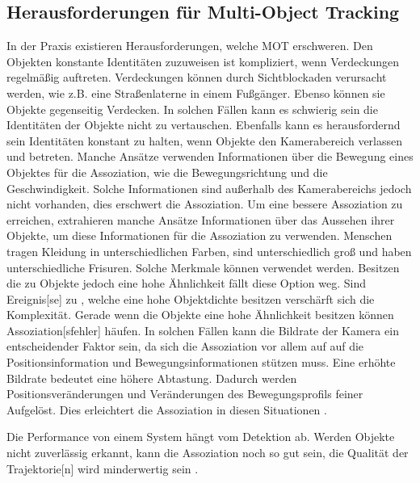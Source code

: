 \subsection{Herausforderungen für Multi-Object Tracking} \label{sec:MOT Herausforderungen}
In der Praxis existieren Herausforderungen, welche \gls{MOT} erschweren. Den Objekten konstante Identitäten zuzuweisen ist kompliziert, wenn Verdeckungen regelmäßig auftreten. Verdeckungen können durch Sichtblockaden verursacht werden, wie z.B. eine Straßenlaterne in einem Fußgänger. Ebenso können sie Objekte gegenseitig Verdecken. In solchen Fällen kann es schwierig sein die Identitäten der Objekte nicht zu vertauschen. Ebenfalls kann es herausfordernd sein Identitäten konstant zu halten, wenn Objekte den Kamerabereich verlassen und betreten. Manche Ansätze verwenden Informationen über die Bewegung eines Objektes für die  \gls{Assoziation}, wie die Bewegungsrichtung und die Geschwindigkeit. Solche Informationen sind außerhalb des Kamerabereichs jedoch nicht vorhanden, dies erschwert die \gls{Assoziation}. Um eine bessere \gls{Assoziation} zu erreichen, extrahieren manche Ansätze Informationen über das Aussehen ihrer Objekte, um diese Informationen für die \gls{Assoziation} zu verwenden. Menschen tragen Kleidung in unterschiedlichen Farben, sind unterschiedlich groß und haben unterschiedliche Frisuren. Solche Merkmale können verwendet werden. Besitzen die zu  Objekte jedoch eine hohe Ähnlichkeit fällt diese Option weg. Sind \gls{Ereignis}[se] zu , welche eine hohe Objektdichte besitzen verschärft sich die Komplexität. Gerade wenn die Objekte eine hohe Ähnlichkeit besitzen können \gls{Assoziation}[sfehler] häufen. 
In solchen Fällen kann die Bildrate der Kamera ein entscheidender Faktor sein, da sich die \gls{Assoziation} vor allem auf auf die Positionsinformation und Bewegungsinformationen stützen muss. Eine erhöhte Bildrate bedeutet eine höhere Abtastung. Dadurch werden Positionsveränderungen und Veränderungen des Bewegungsprofils feiner Aufgelöst. Dies erleichtert die \gls{Assoziation} in diesen Situationen \cite{Luo.2022, Feng.2022}. \par

Die Performance von einem  System hängt vom \gls{Detektion} ab. Werden Objekte nicht zuverlässig erkannt, kann die \gls{Assoziation} noch so gut sein, die Qualität der \gls{Trajektorie}[n] wird minderwertig sein \cite{Luo.2022}. 


